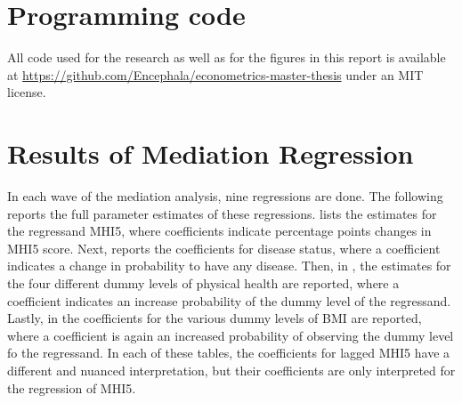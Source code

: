 \chapter{Programming code}
\label{chap:app:code}
All code used for the research as well as for the figures in this report is available at
\url{https://github.com/Encephala/econometrics-master-thesis} under an MIT license.

\chapter{Results of Mediation Regression}
\label{chap:app:mediation_regression}

In each wave of the mediation analysis, nine regressions are done. The following reports the full parameter estimates
of these regressions.
 lists the estimates for the regressand MHI5, where coefficients indicate percentage
points changes in MHI5 score.
Next,  reports the coefficients for disease status, where a coefficient
indicates a change in probability to have any disease.
Then, in ,
the estimates for the four different dummy levels of physical health are reported,
where a coefficient indicates an increase probability of the dummy level of the regressand.
Lastly, in 
the coefficients for the various dummy levels of BMI are reported, where a coefficient is again an increased
probability of observing the dummy level fo the regressand.
In each of these tables, the coefficients for lagged MHI5 have a different and nuanced interpretation,
but their coefficients are only interpreted for the regression of MHI5.

